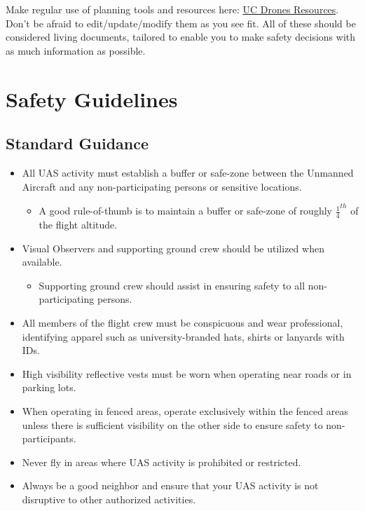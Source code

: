 \documentclass[
]{book}
\providecommand{\tightlist}{%
  \setlength{\itemsep}{0pt}\setlength{\parskip}{0pt}}
\begin{document}
Make regular use of planning tools and resources here: \href{https://ucdrones.github.io/ch-resources.html}{UC Drones Resources}. Don't be afraid to edit/update/modify them as you see fit. All of these should be considered living documents, tailored to enable you to make safety decisions with as much information as possible.

\hypertarget{ch-safety-guidelines}{%
\chapter{Safety Guidelines}\label{ch-safety-guidelines}}

\hypertarget{standard-guidance}{%
\section{Standard Guidance}\label{standard-guidance}}

\begin{itemize}
\tightlist
\item
  All UAS activity must establish a buffer or safe-zone between the Unmanned Aircraft and any non-participating persons or sensitive locations.

  \begin{itemize}
  \tightlist
  \item
    A good rule-of-thumb is to maintain a buffer or safe-zone of roughly \(\frac{1}{4}^{th}\) of the flight altitude.
  \end{itemize}
\item
  Visual Observers and supporting ground crew should be utilized when available.

  \begin{itemize}
  \tightlist
  \item
    Supporting ground crew should assist in ensuring safety to all non-participating persons.
  \end{itemize}
\item
  All members of the flight crew must be conspicuous and wear professional, identifying apparel such as university-branded hats, shirts or lanyards with IDs.
\item
  High visibility reflective vests must be worn when operating near roads or in parking lots.\\
\item
  When operating in fenced areas, operate exclusively within the fenced areas unless there is sufficient visibility on the other side to ensure safety to non-participants.
\item
  Never fly in areas where UAS activity is prohibited or restricted.
\item
  Always be a good neighbor and ensure that your UAS activity is not disruptive to other authorized activities.
\end{itemize}
\end{document}
